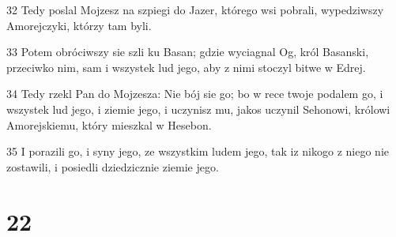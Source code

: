 \par 32 Tedy poslal Mojzesz na szpiegi do Jazer, którego wsi pobrali, wypedziwszy Amorejczyki, którzy tam byli.
\par 33 Potem obróciwszy sie szli ku Basan; gdzie wyciagnal Og, król Basanski, przeciwko nim, sam i wszystek lud jego, aby z nimi stoczyl bitwe w Edrej.
\par 34 Tedy rzekl Pan do Mojzesza: Nie bój sie go; bo w rece twoje podalem go, i wszystek lud jego, i ziemie jego, i uczynisz mu, jakos uczynil Sehonowi, królowi Amorejskiemu, który mieszkal w Hesebon.
\par 35 I porazili go, i syny jego, ze wszystkim ludem jego, tak iz nikogo z niego nie zostawili, i posiedli dziedzicznie ziemie jego.

\chapter{22}

